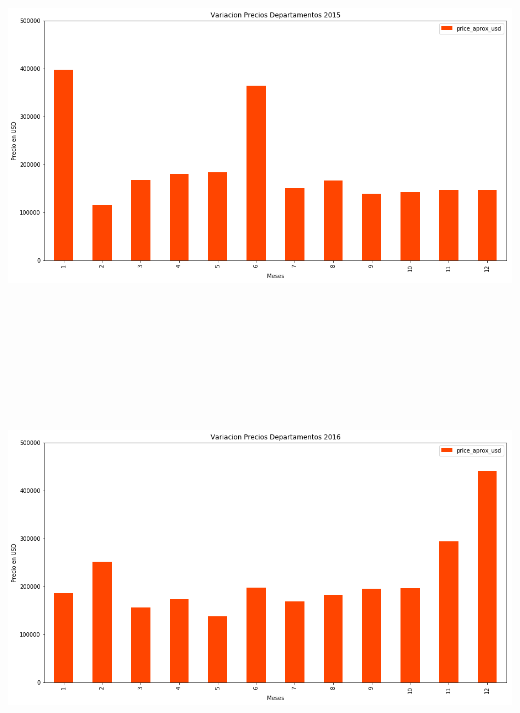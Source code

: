 \documentclass[a4paper, 10pt]{article}
\begin{document}
      \begin{center}
            \includegraphics[width=6in, height=4.2in]{images/vDeptos2015}
      \end{center}
      \begin{center}
            \includegraphics[width=6in, height=4.2in]{images/vDeptos2016}
      \end{center}
\end{document}
